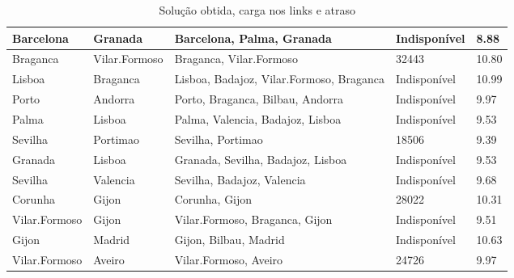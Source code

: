 \begin{table}[!htb]
{\begin{tabular}{|l|l|l|l|l|}
Barcelona & Granada & Barcelona, Palma, Granada & Indisponível & 8.88 \\ \hline
Braganca & Vilar.Formoso & Braganca, Vilar.Formoso & 32443 & 10.80 \\ \hline
Lisboa & Braganca & Lisboa, Badajoz, Vilar.Formoso, Braganca & Indisponível & 10.99 \\ \hline
Porto & Andorra & Porto, Braganca, Bilbau, Andorra & Indisponível & 9.97 \\ \hline
Palma & Lisboa & Palma, Valencia, Badajoz, Lisboa & Indisponível & 9.53 \\ \hline
Sevilha & Portimao & Sevilha, Portimao & 18506 & 9.39 \\ \hline
Granada & Lisboa & Granada, Sevilha, Badajoz, Lisboa & Indisponível & 9.53 \\ \hline
Sevilha & Valencia & Sevilha, Badajoz, Valencia & Indisponível & 9.68 \\ \hline
Corunha & Gijon & Corunha, Gijon & 28022 & 10.31 \\ \hline
Vilar.Formoso & Gijon & Vilar.Formoso, Braganca, Gijon & Indisponível & 9.51 \\ \hline
Gijon & Madrid & Gijon, Bilbau, Madrid & Indisponível & 10.63 \\ \hline
Vilar.Formoso & Aveiro & Vilar.Formoso, Aveiro & 24726 & 9.97 \\ \hline
\end{tabular}}
\caption[]{Solução obtida, carga nos links e atraso}
\end{table}

\begin{table}[!htb]
        \centering
\caption[]{Solução obtida, carga nos links e atraso}
\end{table}

